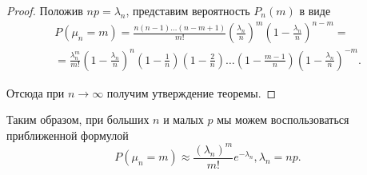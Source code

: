 \begin{proof}
Положив $np = \lambda_n$, представим вероятность $P_n(m)$ в виде
\begin{multline*}
P(\mu_n = m) = \frac{n(n - 1)\ldots(n - m + 1)}{m!} \left( \frac{\lambda_n}{n}\right)^m\left( 1 - \frac{\lambda_n}{n}\right)^{n - m} = \\
= \frac{\lambda_n^m}{m!} \left( 1 - \frac{\lambda_n}{n}\right)^n \left( 1 - \frac{1}{n}\right)\left(1 - \frac{2}{n} \right) \ldots \left( 1 - \frac{m - 1}{n}\right)\left(1 - \frac{\lambda_n}{n} \right)^{-m}.
\end{multline*}

Отсюда при $n \to \infty$ получим утверждение теоремы.
\end{proof}

Таким образом, при больших $n$ и малых $p$ мы можем воспользоваться приближенной формулой
$$
P(\mu_n = m) \approx \frac{(\lambda_n)^m}{m!} e^{-\lambda_n},	\lambda_n = np.
$$
